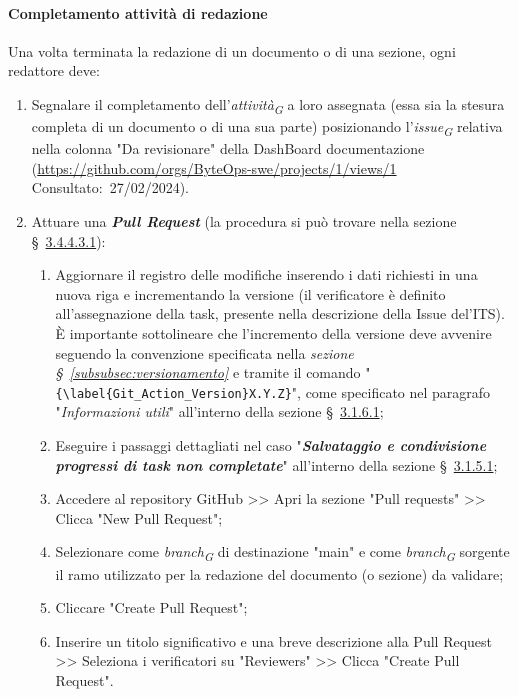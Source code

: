 \paragraph*{\textbf{Completamento attività di redazione}}
Una volta terminata la redazione di un documento o di una sezione, ogni redattore deve:
\begin{enumerate}
    \item Segnalare il completamento dell'\textit{attività}\textsubscript{\textit{G}} a loro assegnata (essa sia la stesura completa di un documento o di una sua parte) posizionando l'\textit{issue}\textsubscript{\textit{G}} relativa nella colonna "Da revisionare" della DashBoard documentazione (\url{https://github.com/orgs/ByteOps-swe/projects/1/views/1} Consultato:~27/02/2024).
    \item Attuare una \textit{\textbf{Pull Request}} (la procedura si può trovare nella sezione \S~\hyperlink{par:creazionePR}{3.4.4.3.1}):
          \begin{enumerate}
              \item Aggiornare il registro delle modifiche inserendo i dati richiesti in una nuova riga e incrementando la versione (il verificatore è definito all'assegnazione della task, presente nella descrizione della Issue del'ITS).
              È importante sottolineare che l'incremento della versione deve avvenire seguendo la convenzione specificata nella \textit{sezione \S~\ref{subsubsec:versionamento}} e tramite il comando "\verb|{\label{Git_Action_Version}X.Y.Z}|", come specificato nel paragrafo "\textit{Informazioni utili}" all'interno della sezione \S~\hyperlink{par:infoUtiliRegistroMod}{3.1.6.1};
              \item Eseguire i passaggi dettagliati nel caso "\textit{\textbf{Salvataggio e condivisione progressi di task non completate}}" all'interno della sezione \S~\hyperlink{par:Redattori}{3.1.5.1};
              \item Accedere al repository GitHub >> Apri la sezione "Pull requests" >> Clicca "New Pull Request";
              \item Selezionare come \textit{branch}\textsubscript{\textit{G}} di destinazione "main" e come \textit{branch}\textsubscript{\textit{G}} sorgente il ramo utilizzato per la redazione del documento (o sezione) da validare;
              \item Cliccare "Create Pull Request";
              \item Inserire un titolo significativo e una breve descrizione alla Pull Request >> Seleziona i verificatori su "Reviewers" >> Clicca "Create Pull Request".
          \end{enumerate}
\end{enumerate}

